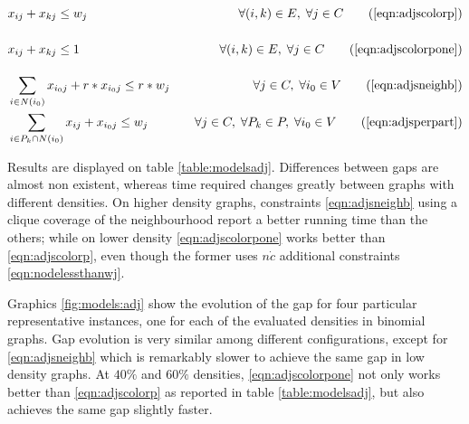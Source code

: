 \begin{align*}
&x_{ij} + x_{kj} \leq w_j \sumheight &\quad \forall (i,k) \in E, \; \forall j \in C \tag{\ref{eqn:adjscolorp}} \\
&x_{ij} + x_{kj} \leq 1 \sumheight &\quad \forall (i,k) \in E, \; \forall j \in C \tag{\ref{eqn:adjscolorpone}} \\
&\sum_{i \in N(i_0)} x_{i_0j} + r * x_{i_0j} \leq r * w_j &\quad \forall j \in C, \; \forall i_0 \in V \tag{\ref{eqn:adjsneighb}} \\
&\sum_{i \in P_k \cap N(i_0)} x_{ij} + x_{i_0j} \leq w_j &\quad \forall j \in C, \; \forall P_k \in P, \; \forall i_0 \in V \tag{\ref{eqn:adjsperpart}} 
\end{align*}

Results are displayed on table \ref{table:modelsadj}. Differences between gaps are almost non existent, whereas time required changes greatly between graphs with different densities. On higher density graphs, constraints \ref{eqn:adjsneighb} using a clique coverage of the neighbourhood report a better running time than the others; while on lower density \ref{eqn:adjscolorpone} works better than \ref{eqn:adjscolorp}, even though the former uses $n \dot c$ additional constraints \ref{eqn:nodelessthanwj}.

Graphics \ref{fig:models:adj} show the evolution of the gap for four particular representative instances, one for each of the evaluated densities in binomial graphs. Gap evolution is very similar among different configurations, except for \ref{eqn:adjsneighb} which is remarkably slower to achieve the same gap in low density graphs. At $40\%$ and $60\%$ densities, \ref{eqn:adjscolorpone} not only works better than \ref{eqn:adjscolorp} as reported in table \ref{table:modelsadj}, but also achieves the same gap slightly faster.

